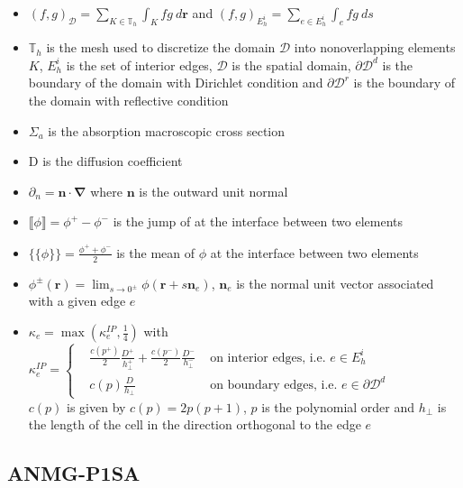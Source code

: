 \documentclass[preprint,10pt]{elsarticle}
\newcommand\bn{\boldsymbol{\nabla}}
\newcommand\br{\mathbf{r}}
\newcommand\bs{\boldsymbol}
\newcommand\ldb{\{\!\!\{}
\newcommand\rdb{\}\!\!\}}
\newcommand\llb{\llbracket}
\newcommand\rrb{\rrbracket}
\renewcommand{\(}{\left(}
\renewcommand{\)}{\right)}
\renewcommand{\[}{\left[}
\renewcommand{\]}{\right]}
\begin{document}
\begin{itemize}
\item $(f,g)_{\mathcal{D}} = \sum_{K\in \mathbb{T}_h} \int_K fg\ d\br$ and 
$(f,g)_{E_h^i} = \sum_{e\in E_h^i} \int_e fg\ ds$
\item $\mathbb{T}_h$ is the mesh used to discretize the domain $\mathcal{D}$
into nonoverlapping elements $K$, $E_h^i$ is the set of interior edges,
$\mathcal{D}$ is the spatial domain, $\partial \mathcal{D}^d$ is the boundary
of the domain with Dirichlet condition and $\partial \mathcal{D}^r$ is the
boundary of the domain with reflective condition
\item $\Sigma_a$ is the absorption macroscopic cross section
\item $\mathrm{D}$ is the diffusion coefficient
\item $\partial_n = \bs{n}\cdot \bn$ where $\bs{n}$ is the outward unit
normal
\item $\llb \phi\rrb = \phi^{+}-\phi^{-}$ is the jump of at the interface
between two elements
\item $\ldb\phi\rdb = \frac{\phi^++\phi^-}{2}$ is the mean of $\phi$ at the
interface between two elements
\item $\phi^{\pm}(\br)=\lim_{s\to 0^{\pm}}\phi(\br+s\bs{n}_e)$, $\bs{n}_e$ is
the normal unit vector associated with a given edge $e$
\item $\kappa_e = \max\(\kappa_e^{IP},\frac{1}{4}\)$ with
$\kappa_e^{IP}=\left\{
\begin{aligned}
&\frac{c(p^+)}{2}\frac{D^+}{h_{\bot}^+} + \frac{c(p^-)}{2}
\frac{D^-}{h_{\bot}^-} &\textrm{ on interior edges, i.e. }e\in E_h^i\\
&c(p)\frac{D}{h_{\bot}} & \textrm{ on boundary edges,
i.e. }e\in\partial\mathcal{D}^d
\end{aligned}
\right.$\\
$c(p)$ is given by $c(p)=2p(p+1)$, $p$ is the polynomial order and $h_{\bot}$
is the length of the cell in the direction orthogonal to the edge $e$
\end{itemize}

\subsection{ANMG-P1SA}
\end{document}
